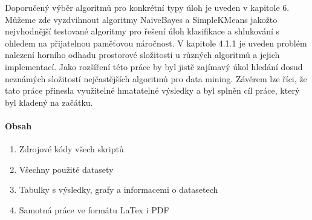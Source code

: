 \documentclass[12pt]{article}
\begin{document}
\newline
\indent
Doporučený výběr algoritmů pro konkrétní typy úloh je uveden v kapitole 6. Můžeme zde vyzdvihnout algoritmy NaiveBayes a SimpleKMeans jakožto nejvhodnější testované algoritmy pro řešení úloh klasifikace a shlukování s ohledem na přijatelnou paměťovou náročnost.
\newline
\indent
V kapitole 4.1.1 je uveden problém nalezení horního odhadu prostorové složitosti u různých algoritmů a jejich implementací. Jako rozšíření této práce by byl jistě zajímavý úkol hledání dosud neznámých složitostí nejčastějších algoritmů pro data mining. 
\newline
\indent
Závěrem lze říci, že tato práce přinesla využitelné hmatatelné výsledky a byl splněn cíl práce, který byl kladený na začátku.


\prilohy
{}
\paragraph{Obsah}
\begin{enumerate}
\item Zdrojové kódy všech skriptů
\item Všechny použité datasety
\item Tabulky s výsledky, grafy a informacemi o datasetech
\item Samotná práce ve formátu LaTex i PDF
\end{enumerate}
\end{document}
